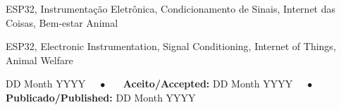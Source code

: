 \documentclass[portuguese]{sbcreviews-2025}%
\begin{document}
\begin{frontmatter}
\begin{pchaves}
ESP32, Instrumentação Eletrônica, Condicionamento de Sinais, Internet das Coisas, Bem-estar Animal
\end{pchaves}

\begin{keywords}
ESP32, Electronic Instrumentation, Signal Conditioning, Internet of Things, Animal Welfare
\end{keywords}

\begin{dates}
 DD Month YYYY~~~$\bullet$~~~
{\sffamily\textbf{Aceito/Accepted:}} DD Month YYYY~~~$\bullet$~~~
{\sffamily\textbf{Publicado/Published:}} DD Month YYYY
\end{dates}

\end{frontmatter}










\end{document}
